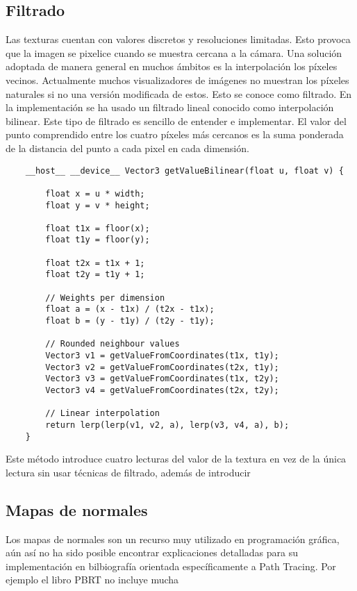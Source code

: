 	\subsection{Filtrado}
			
	Las texturas cuentan con valores discretos y resoluciones limitadas. Esto provoca que la imagen se pixelice cuando se muestra cercana a la cámara. Una solución adoptada de manera general en muchos ámbitos es la interpolación los píxeles vecinos. Actualmente muchos visualizadores de imágenes no muestran los píxeles naturales si no una versión modificada de estos. Esto se conoce como filtrado. En la implementación se ha usado un filtrado lineal conocido como interpolación bilinear. Este tipo de filtrado es sencillo de entender e implementar. El valor del punto  comprendido entre los cuatro píxeles más cercanos es la suma ponderada de la distancia del punto a cada pixel en cada dimensión. 	
	\begin{lstlisting}
	__host__ __device__ Vector3 getValueBilinear(float u, float v) {
        
        float x = u * width;
        float y = v * height;

        float t1x = floor(x);
        float t1y = floor(y);

        float t2x = t1x + 1;
        float t2y = t1y + 1;

		// Weights per dimension
        float a = (x - t1x) / (t2x - t1x);
        float b = (y - t1y) / (t2y - t1y);

		// Rounded neighbour values
        Vector3 v1 = getValueFromCoordinates(t1x, t1y);
        Vector3 v2 = getValueFromCoordinates(t2x, t1y);
        Vector3 v3 = getValueFromCoordinates(t1x, t2y);
        Vector3 v4 = getValueFromCoordinates(t2x, t2y);

		// Linear interpolation
        return lerp(lerp(v1, v2, a), lerp(v3, v4, a), b);
	}
	\end{lstlisting}
	
	Este método introduce cuatro lecturas del valor de la textura en vez de la única lectura sin usar técnicas de filtrado, además de introducir 
	
	\subsection{Mapas de normales}
	
	Los mapas de normales son un recurso muy utilizado en programación gráfica, aún así no ha sido posible encontrar explicaciones detalladas para su implementación en bilbiografía orientada específicamente a Path Tracing. Por ejemplo el libro PBRT\cite{pharr2016physically} no incluye mucha
	
